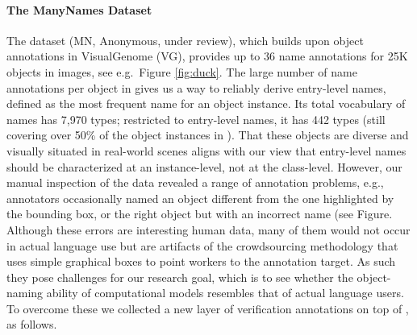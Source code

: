\paragraph{The ManyNames Dataset}
The \mn dataset (MN, Anonymous, under review), which builds upon object annotations in VisualGenome (VG), provides up to 36 name annotations for 25K objects in images, see e.g.\ Figure \ref{fig:duck}.
The large number of name annotations per object in \mn gives us a way to reliably derive entry-level names, defined as the most frequent name for an object instance.
Its total vocabulary of names has 7,970 types; restricted to entry-level names, it has 442 types (still covering over 50\% of the object instances in \vg).
That these objects are diverse and visually situated in real-world scenes aligns with our view that entry-level names should be characterized at an instance-level, not at the class-level.
However, our manual inspection of the \mn data revealed a range of annotation problems, e.g., annotators occasionally named an object different from the one highlighted by the bounding box, or the right object but with an incorrect name (see Figure.
Although these errors are interesting human data, many of them would not occur in actual language use but are artifacts of the crowdsourcing methodology that uses simple graphical boxes to point workers to the annotation target.
As such they pose challenges for our research goal, which is to see whether the object-naming ability of computational models resembles that of actual language users.
To overcome these we collected a new layer of verification annotations on top of \mn, as follows.


